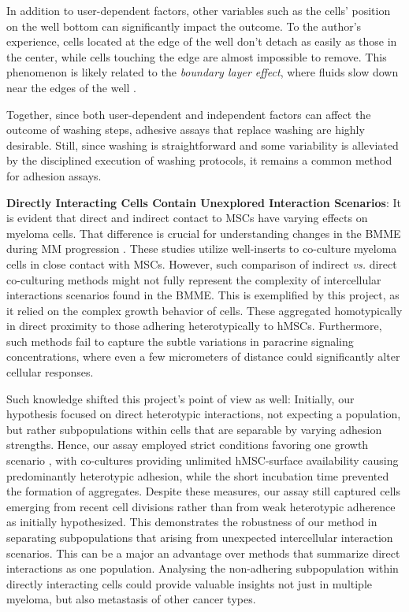 In addition to user-dependent factors, other variables such as the cells'
position on the well bottom can significantly impact the outcome. To the
author's experience, cells located at the edge of the well don't detach as
easily as those in the center, while cells touching the edge are almost
impossible to remove. This phenomenon is likely related to the \textit{boundary
    layer effect}, where fluids slow down near the edges of the well
\cite{weyburneNewThicknessShape2014}.

Together, since both user-dependent and independent factors can affect the
outcome of washing steps, adhesive assays that replace washing are highly
desirable. Still, since washing is straightforward and some variability is
alleviated by the disciplined execution of washing protocols, it remains a
common method for adhesion assays.




\textbf{Directly Interacting Cells Contain Unexplored Interaction Scenarios}: It
is evident that direct and indirect contact to \acp{MSC} have varying effects on
myeloma cells. That difference is crucial for understanding changes in the
\ac{BMME} during MM progression \cite{fairfieldMultipleMyelomaCells2020,
    dziadowiczBoneMarrowStromaInduced2022}. These studies utilize well-inserts to
co-culture myeloma cells in close  contact with MSCs.
However, such comparison of indirect \textit{vs.} direct co-culturing methods
might not fully represent the complexity of intercellular interactions scenarios
found in the \ac{BMME}. This is exemplified by this project, as it relied on the
complex growth behavior of \INA cells. These aggregated homotypically in direct
proximity to those adhering heterotypically to \acp{hMSC}. Furthermore, such
methods fail to capture the subtle variations in paracrine signaling
concentrations, where even a few micrometers of distance could significantly
alter cellular responses.

Such knowledge shifted this project's point of view as well: Initially, our
hypothesis focused on direct heterotypic interactions, not expecting a \nMAina
population, but rather subpopulations within \MAina cells that are separable by
varying adhesion strengths. Hence, our assay employed strict conditions favoring
one growth scenario , with co-cultures providing unlimited hMSC-surface
availability causing predominantly heterotypic adhesion, while the short
incubation time prevented the formation of aggregates. Despite these measures,
our assay still captured cells emerging from recent cell divisions rather than
from weak heterotypic adherence as initially hypothesized. This demonstrates the
robustness of our method in separating subpopulations that arising from unexpected
intercellular interaction scenarios. This can be a major an advantage over
methods that summarize direct interactions as one population. Analysing the
non-adhering subpopulation within directly interacting cells could provide
valuable insights not just in multiple myeloma, but also metastasis of other
cancer types.


